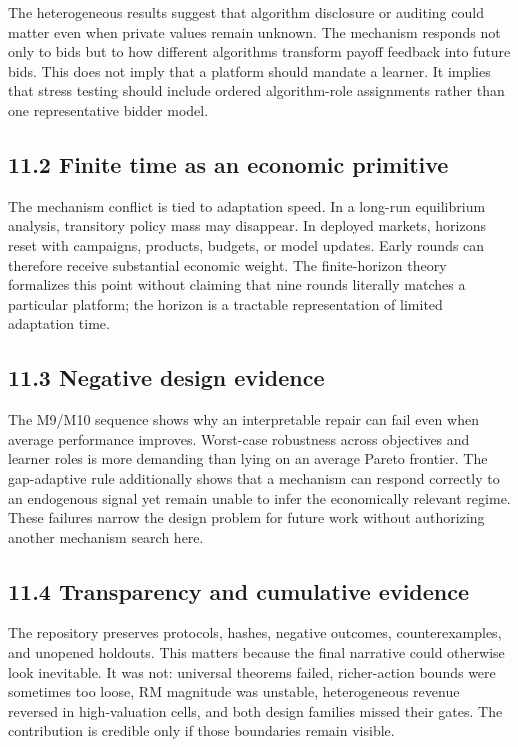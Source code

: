 \documentclass[11pt]{article}
\begin{document}
The heterogeneous results suggest that algorithm disclosure or auditing could matter even when private values remain unknown. The mechanism responds not only to bids but to how different algorithms transform payoff feedback into future bids. This does not imply that a platform should mandate a learner. It implies that stress testing should include ordered algorithm-role assignments rather than one representative bidder model.

\subsection{11.2 Finite time as an economic primitive}
The mechanism conflict is tied to adaptation speed. In a long-run equilibrium analysis, transitory policy mass may disappear. In deployed markets, horizons reset with campaigns, products, budgets, or model updates. Early rounds can therefore receive substantial economic weight. The finite-horizon theory formalizes this point without claiming that nine rounds literally matches a particular platform; the horizon is a tractable representation of limited adaptation time.

\subsection{11.3 Negative design evidence}
The M9/M10 sequence shows why an interpretable repair can fail even when average performance improves. Worst-case robustness across objectives and learner roles is more demanding than lying on an average Pareto frontier. The gap-adaptive rule additionally shows that a mechanism can respond correctly to an endogenous signal yet remain unable to infer the economically relevant regime. These failures narrow the design problem for future work without authorizing another mechanism search here.

\subsection{11.4 Transparency and cumulative evidence}
The repository preserves protocols, hashes, negative outcomes, counterexamples, and unopened holdouts. This matters because the final narrative could otherwise look inevitable. It was not: universal theorems failed, richer-action bounds were sometimes too loose, RM magnitude was unstable, heterogeneous revenue reversed in high-valuation cells, and both design families missed their gates. The contribution is credible only if those boundaries remain visible.
\end{document}
